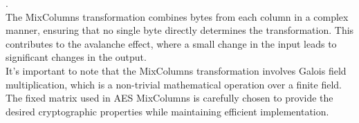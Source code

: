 \documentclass{report}
\begin{document}

.\\
The MixColumns transformation combines bytes from each column in a complex manner, ensuring that no single byte directly determines the transformation. This contributes to the avalanche effect, where a small change in the input leads to significant changes in the output.\\
It's important to note that the MixColumns transformation involves Galois field multiplication, which is a non-trivial mathematical operation over a finite field. The fixed matrix used in AES MixColumns is carefully chosen to provide the desired cryptographic properties while maintaining efficient implementation.
\end{document}
